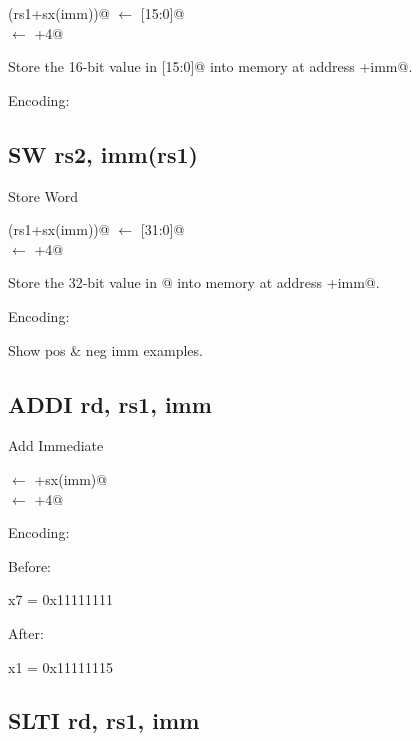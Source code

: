 (rs1+sx(imm))@ $\leftarrow$ [15:0]@\\
\verb@pc@ $\leftarrow$ \verb@pc+4@

Store the 16-bit value in [15:0]@ into memory at 
address +imm@.


Encoding:


\subsection{SW rs2, imm(rs1)}

Store Word

(rs1+sx(imm))@ $\leftarrow$ [31:0]@\\
\verb@pc@ $\leftarrow$ \verb@pc+4@

Store the 32-bit value in @ into memory at address +imm@.

Encoding:


Show pos \& neg imm examples.

\subsection{ADDI rd, rs1, imm}

Add Immediate

\verb@rd@ $\leftarrow$ +sx(imm)@\\
\verb@pc@ $\leftarrow$ \verb@pc+4@

Encoding:


Before:

x7 = 0x11111111

After:

x1 = 0x11111115

\subsection{SLTI rd, rs1, imm}

